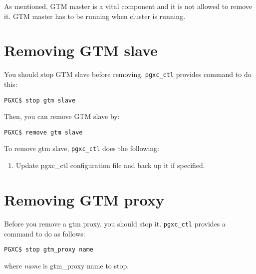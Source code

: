   As mentioned, GTM master is a vital \XC{} component and it is not allowed to remove it.
  GTM master has to be running when \XC{} cluster is running.



\section{Removing GTM slave}

  You should stop GTM slave before removing.
  \verb|pgxc_ctl| provides command to do this:
  
  \begin{lstlisting}[frame=single]
PGXC$ stop gtm slave
  \end{lstlisting}
  
  Then, you can remove GTM slave by:
  
  \begin{lstlisting}[frame=single]
PGXC$ remove gtm slave
  \end{lstlisting}
  
  To remove gtm slave, \verb|pgxc_ctl| does the following:
  
  \begin{enumerate}
	  \item Update pgxc\_ctl configuration file and back up it if specified.
  \end{enumerate}



\section{Removing GTM proxy}

  Before you remove a gtm proxy, you should stop it.
  \verb|pgxc_ctl| provides a command to do as follows:
  
  \begin{lstlisting}[frame=single]
PGXC$ stop gtm_proxy name
  \end{lstlisting}
  
  where {\it name} is gtm\_proxy name to stop.
  
